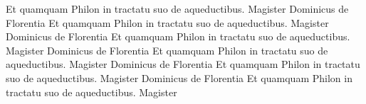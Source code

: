 \documentclass{book}
\begin{document}
\begin{pairs}
\begin{Rightside}
Et quamquam Philon in tractatu suo de aqueductibus. Magister Dominicus de Florentia
Et quamquam Philon in tractatu suo de aqueductibus. Magister Dominicus de Florentia
Et quamquam Philon in tractatu suo de aqueductibus. Magister Dominicus de Florentia
Et quamquam Philon in tractatu suo de aqueductibus. Magister Dominicus de Florentia
Et quamquam Philon in tractatu suo de aqueductibus. Magister Dominicus de Florentia
Et quamquam Philon in tractatu suo de aqueductibus. Magister 



\pend
\endnumbering
\end{Rightside}

\end{pairs}
\Columns
\end{document}
